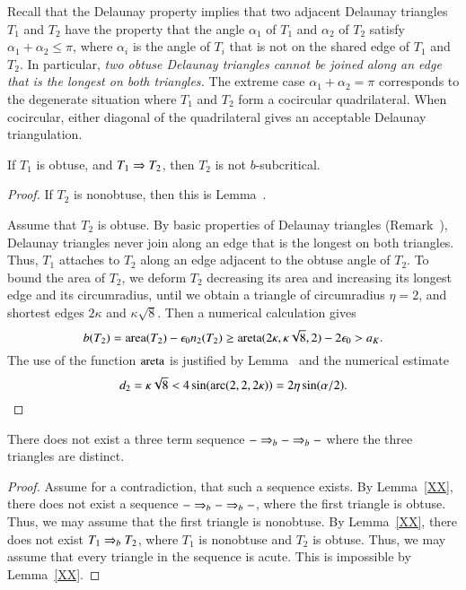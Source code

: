 \begin{remark}
  Recall that the Delaunay property implies that two adjacent Delaunay
  triangles $T_1$ and $T_2$ have the property that the angle
  $\alpha_1$ of $T_1$ and $\alpha_2$ of $T_2$ satisfy $\alpha_1 +
  \alpha_2\le \pi$, where $\alpha_i$ is the angle of $T_i$ that is not
  on the shared edge of $T_1$ and $T_2$.  In particular, {\it two
    obtuse Delaunay triangles cannot be joined along an edge that is
    the longest on both triangles.}  The extreme case
  $\alpha_1+\alpha_2=\pi$ corresponds to the degenerate situation
  where $T_1$ and $T_2$ form a cocircular quadrilateral. When
  cocircular, either diagonal of the quadrilateral gives an acceptable
  Delaunay triangulation.
\end{remark}



\begin{lemma}
  If $T_1$ is obtuse, and $T_1 \Rightarrow T_2$, then $T_2$ is not
  $b$-subcritical.
\end{lemma}


\begin{proof}  If $T_2$ is nonobtuse, then this is Lemma~.

Assume that $T_2$ is obtuse.  By basic properties of Delaunay
triangles (Remark~), Delaunay triangles never join
along an edge that is the longest on both triangles.  Thus, $T_1$
attaches to $T_2$ along an edge adjacent to the obtuse angle of $T_2$.
To bound the area of $T_2$, we deform $T_2$ decreasing its area and
increasing its longest edge and its circumradius, until we obtain a
triangle of circumradius $\eta=2$, and shortest edges $2\kappa$ and
$\kappa\sqrt{8}$.  Then a numerical calculation gives
\[
b(T_2) = {\operatorname{area}}(T_2) - \epsilon_0 n_2(T_2) \ge 
{\operatorname{areta}}(2\kappa,\kappa\sqrt{8},2) - 2\epsilon_0 > a_K.
\] %
The use of the function ${\operatorname{areta}}$ is justified by
Lemma~ and the numerical estimate
\[
d_2 = \kappa\sqrt8 <  4 \sin(\operatorname{arc}(2,2,2\kappa)) = 2\eta\sin(\alpha/2).
\] %
\end{proof}


\begin{lemma}\label{lemma:sequence}  There does not exist a three
term sequence $- \Rightarrow_{b} -\Rightarrow_{b} -$ where  the three triangles  are distinct.
\end{lemma}

\begin{proof}  
Assume for a contradiction, that such a sequence exists.
By Lemma~\ref{XX}, there does not exist a sequence $- \Rightarrow_{b} - \Rightarrow_{b} -$,
where the first triangle is obtuse.  Thus, we may assume that the first
triangle is nonobtuse.
By Lemma~\ref{XX}, there does not exist $T_1\Rightarrow_{b} T_2$,
where $T_1$ is nonobtuse and $T_2$ is obtuse.  Thus, we may assume
that every triangle in the sequence is acute.  This is impossible by
Lemma~\ref{XX}.
\end{proof}

